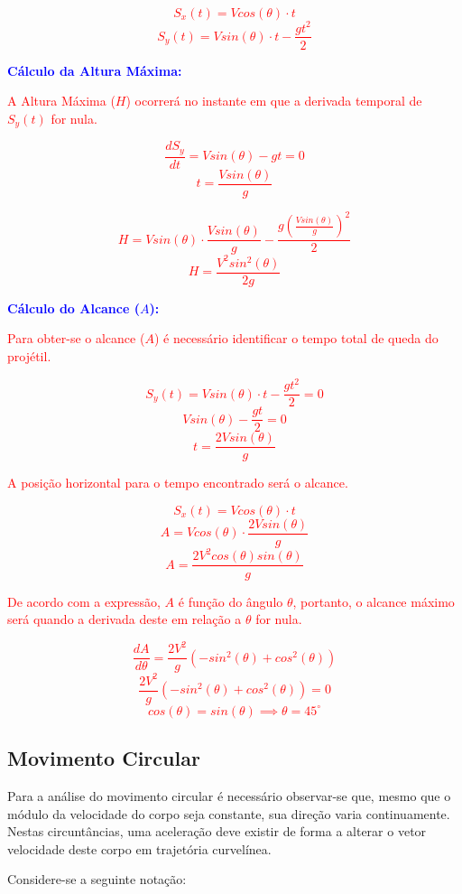 \documentclass[
    12pt, %
    openright,
    twoside, %
    a4paper, %
    article,
    english,brazil %
]{abntex2}
\begin{document}
\textcolor{red}{
    $$S_x(t) = V cos(\theta) \cdot t$$
    $$S_y(t) = V sin(\theta) \cdot t - \frac{gt^2}{2}$$
}

\textcolor{blue}{\textbf{Cálculo da Altura Máxima:}}

\textcolor{red}{A Altura Máxima ($H$) ocorrerá no instante em que a derivada temporal de $S_y(t)$ for nula.}

\textcolor{red}{
    $$\frac{dS_y}{dt} = V sin(\theta) - gt = 0$$
    $$t = \frac{V sin(\theta)}{g}$$
}

\textcolor{red}{
    $$H = V sin(\theta) \cdot \frac{V sin(\theta)}{g} - \frac{g (\frac{V sin(\theta)}{g})^2}{2}$$
    $$H = \frac{V^2 sin^2(\theta)}{2g}$$
}

\textcolor{blue}{\textbf{Cálculo do Alcance ($A$):}}

\textcolor{red}{Para obter-se o alcance ($A$) é necessário identificar o tempo total de queda do projétil.}

\textcolor{red}{
    $$S_y(t) = V sin(\theta) \cdot t - \frac{gt^2}{2} = 0$$
    $$V sin(\theta) - \frac{gt}{2} = 0$$
    $$t = \frac{2V sin(\theta)}{g}$$
}

\textcolor{red}{A posição horizontal para o tempo encontrado será o alcance.}

\textcolor{red}{
    $$S_x(t) = V cos(\theta) \cdot t$$
    $$A = V cos(\theta) \cdot \frac{2V sin(\theta)}{g}$$
    $$A = \frac{2V^2 cos(\theta)sin(\theta)}{g}$$
}

\textcolor{red}{De acordo com a expressão, $A$ é função do ângulo $\theta$, portanto, o alcance máximo será quando a derivada deste em relação a $\theta$ for nula.}

\textcolor{red}{
    $$\frac{dA}{d\theta} = \frac{2V^2}{g}(-sin^2(\theta) + cos^2(\theta))$$
    $$\frac{2V^2}{g}(-sin^2(\theta) + cos^2(\theta)) = 0$$
    $$cos(\theta) = sin(\theta) \implies \theta = 45^\circ$$
}

\subsection{Movimento Circular}

Para a análise do movimento circular é necessário observar-se que, mesmo que o módulo da velocidade do corpo seja constante, sua direção varia continuamente. Nestas circuntâncias, uma aceleração deve existir de forma a alterar o vetor velocidade deste corpo em trajetória curvelínea. 

Considere-se a seguinte notação:
\end{document}
